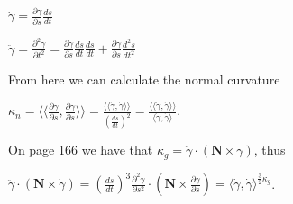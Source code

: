 \documentclass[12pt, a4paper]{article}
\begin{document}
\begin{flushleft}

        \centerline{$\dot{\gamma}=\frac{\partial\gamma}{\partial s}\frac{ds}{dt}$}
        
\vspace{2mm}

        \centerline{$\ddot{\gamma}=\frac{\partial^2 \gamma}{\partial t^2}=\frac{\partial\gamma}{\partial s}\frac{ds}{dt}\frac{ds}{dt}+\frac{\partial\gamma}{\partial s}\frac{d^2 s}{dt^2}$}
        
\vspace{4mm}

    From here we can calculate the normal curvature\par
    
\vspace{4mm}

        \centerline{$\kappa_n=\langle\langle\frac{\partial\gamma}{\partial s},\frac{\partial\gamma}{\partial s}\rangle\rangle=\frac{\langle\langle\dot{\gamma},\dot{\gamma}\rangle\rangle}{(\frac{ds}{dt})^2}=\frac{\langle\langle\dot{\gamma},\dot{\gamma}\rangle\rangle}{\langle\dot{\gamma},\dot{\gamma}\rangle}$.}
        
\vspace{4mm}

    On page 166 we have that $\kappa_g=\ddot{\gamma}\cdot(\mathbf{N}\times\dot{\gamma})$, thus\par
    
\vspace{4mm}

        \centerline{$\ddot{\gamma}\cdot(\mathbf{N}\times\dot{\gamma})=(\frac{ds}{dt})^3\frac{\partial^2\gamma}{\partial s^2}\cdot(\mathbf{N}\times\frac{\partial\gamma}{\partial s})=\langle\dot{\gamma},\dot{\gamma}\rangle^{ \frac{3}{2}\kappa_g}$.}

\end{flushleft}



\vspace{8mm}
\end{document}
